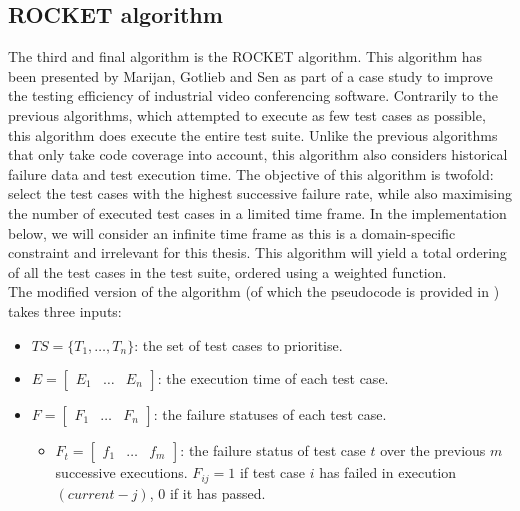 
\subsection{ROCKET algorithm}
\label{ssec:alg-rocket}

The third and final algorithm is the ROCKET algorithm. This algorithm has been presented by Marijan, Gotlieb and Sen \cite{6676952} as part of a case study to improve the testing efficiency of industrial video conferencing software.
 Contrarily to the previous algorithms, which attempted to execute as few test cases as possible, this algorithm does execute the entire test suite. Unlike the previous algorithms that only take code coverage into account, this algorithm also considers historical failure data and test execution time. The objective of this algorithm is twofold: select the test cases with the highest successive failure rate, while also maximising the number of executed test cases in a limited time frame. In the implementation below, we will consider an infinite time frame as this is a domain-specific constraint and irrelevant for this thesis. This algorithm will yield a total ordering of all the test cases in the test suite, ordered using a weighted function.\\

\noindent The modified version of the algorithm (of which the pseudocode is provided in ) takes three inputs:
\begin{itemize}
	\item $TS = \{T_1, \dots, T_n\}$: the set of test cases to prioritise.
	\item $E = \begin{bmatrix}
		E_1 & \dots & E_n
	\end{bmatrix}$: the execution time of each test case.
	\item $F = \begin{bmatrix}
		F_1 & \dots & F_n
	\end{bmatrix}$: the failure statuses of each test case.
		\begin{itemize}
			\item $F_t = \begin{bmatrix}
				f_1 & \dots & f_m
			\end{bmatrix}$: the failure status of test case $t$ over the previous $m$ successive executions. $F_{ij} = 1$ if test case $i$ has failed in execution $(current - j)$, $0$ if it has passed.
		\end{itemize}
\end{itemize}

